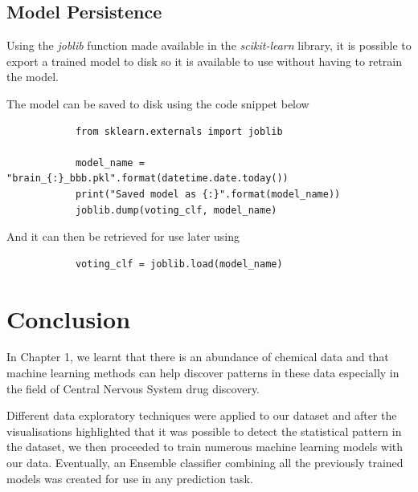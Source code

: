 \documentclass[a4paper,12pt]{report}
\begin{document}
	\section{Model Persistence} 
	Using the \textit{joblib} function made available in the \textit{scikit-learn} library, it is possible to export a trained model to disk so it is available to use without having to retrain the model.
	
	The model can be saved to disk using the code snippet below
		\begin{verbatim}
			from sklearn.externals import joblib

			model_name = "brain_{:}_bbb.pkl".format(datetime.date.today())
			print("Saved model as {:}".format(model_name))
			joblib.dump(voting_clf, model_name) 
		\end{verbatim}
	And it can then be retrieved for use later using
		\begin{verbatim}
			voting_clf = joblib.load(model_name)
		\end{verbatim}
		


\chapter{Conclusion}
	In Chapter 1, we learnt that there is an abundance of chemical data and that machine learning methods can help discover patterns in these data especially in the field of Central Nervous System drug discovery.
	
	Different data exploratory techniques were applied to our dataset and after the visualisations highlighted that it was possible to detect the statistical pattern in the dataset, we then proceeded to train numerous machine learning models with our data. Eventually, an Ensemble classifier combining all the previously trained models was created for use in any prediction task.
\end{document}

